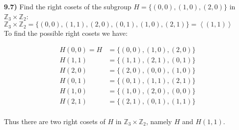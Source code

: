 \documentclass{scrartcl}
\begin{document}
\textbf{9.7)} Find the right cosets of the subgroup $H=\{(0,0), (1,0), (2,0)\}$ in $\mathbb{Z}_3\times\mathbb{Z}_2$:\\
$\mathbb{Z}_3\times\mathbb{Z}_2 = \{(0,0), (1,1), (2,0), (0,1), (1,0), (2,1)\}=\left<(1,1)\right>$\\

To find the possible right cosets we have:
\begin{center}
\begin{align*}
H(0,0) = H &= \{(0,0), (1,0), (2,0)\}\\
H(1,1) &= \{(1,1), (2,1), (0,1)\}\\
H(2,0) &= \{(2,0), (0,0), (1,0)\}\\
H(0,1) &= \{(0,1), (1,1), (2,1)\}\\
H(1,0) &= \{(1,0), (2,0), (0,0)\}\\
H(2,1) &= \{(2,1), (0,1), (1,1)\}\\
\end{align*}
\end{center}

Thus there are two right cosets of $H$ in $\mathbb{Z}_3\times\mathbb{Z}_2$, namely $H$ and $H(1,1)$. 
\end{document}
